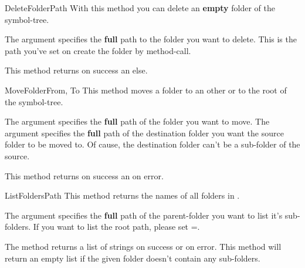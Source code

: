 \begin{methoddesc}[System]{DeleteFolder}{Path}
With this method you can delete an \textbf{empty} folder of the symbol-tree.

The argument  specifies the \textbf{full} path to the folder you want to
delete. This is the path you've set on create the folder by 
 method-call.

This method returns  on success an  else.
\end{methoddesc}


\begin{methoddesc}[System]{MoveFolder}{From, To}
This method moves a folder to an other or to the root of the symbol-tree.

The argument  specifies the \textbf{full} path of the folder you want
to move. The argument  specifies the \textbf{full} path of the destination 
folder you want the source folder to be moved to. Of cause, the destination folder
can't be a sub-folder of the source.

This method returns  on success an  on error.
\end{methoddesc}


\begin{methoddesc}[System]{ListFolders}{Path}
This method returns the names of all folders in .

The argument  specifies the \textbf{full} path of the parent-folder
you want to list it's sub-folders. If you want to list the root path, please 
set =.

The method returns a list of strings on success or  on error. 
This method will return an empty list if the given folder doesn't contain 
any sub-folders.
\end{methoddesc}


